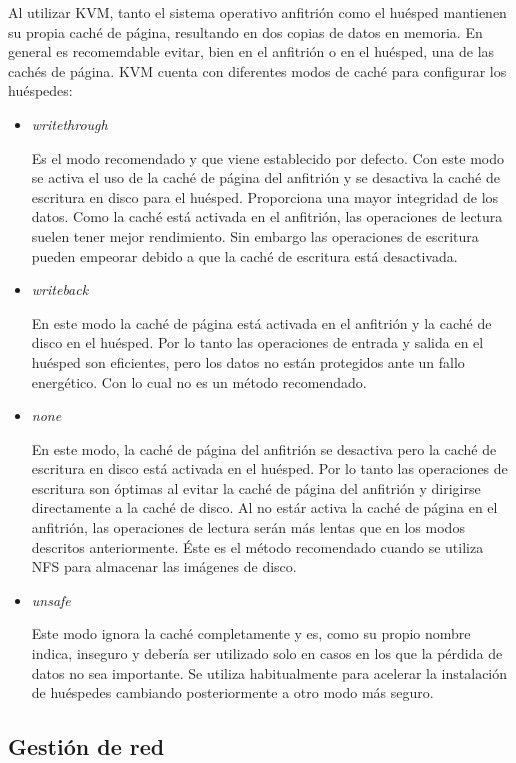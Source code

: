 \documentclass[spanisheDIVcalc,twoside,parskip-,pointlessnumbers,final]{scrbook}
\begin{document}
Al utilizar KVM, tanto el sistema operativo anfitrión como el huésped
mantienen su propia caché de página, resultando en dos copias de datos
en memoria. En general es recomemdable evitar, bien en el anfitrión
o en el huésped, una de las cachés de página. KVM cuenta con diferentes
modos de caché para configurar los huéspedes:
\begin{itemize}
\item \emph{writethrough}


Es el modo recomendado y que viene establecido por defecto. Con este
modo se activa el uso de la caché de página del anfitrión y se desactiva
la caché de escritura en disco para el huésped. Proporciona una mayor
integridad de los datos. Como la caché está activada en el anfitrión,
las operaciones de lectura suelen tener mejor rendimiento. Sin embargo
las operaciones de escritura pueden empeorar debido a que la caché
de escritura está desactivada.

\item \emph{writeback}


En este modo la caché de página está activada en el anfitrión y la
caché de disco en el huésped. Por lo tanto las operaciones de entrada
y salida en el huésped son eficientes, pero los datos no están protegidos
ante un fallo energético. Con lo cual no es un método recomendado.

\item \emph{none}


En este modo, la caché de página del anfitrión se desactiva pero la
caché de escritura en disco está activada en el huésped. Por lo tanto
las operaciones de escritura son óptimas al evitar la caché de página
del anfitrión y dirigirse directamente a la caché de disco. Al no
estár activa la caché de página en el anfitrión, las operaciones de
lectura serán más lentas que en los modos descritos anteriormente.
Éste es el método recomendado cuando se utiliza NFS para almacenar
las imágenes de disco.

\item \emph{unsafe}


Este modo ignora la caché completamente y es, como su propio nombre
indica, inseguro y debería ser utilizado solo en casos en los que la
pérdida de datos no sea importante. Se utiliza habitualmente para
acelerar la instalación de huéspedes cambiando posteriormente a otro
modo más seguro.

\end{itemize}

\subsection{Gestión de red}
\end{document}
